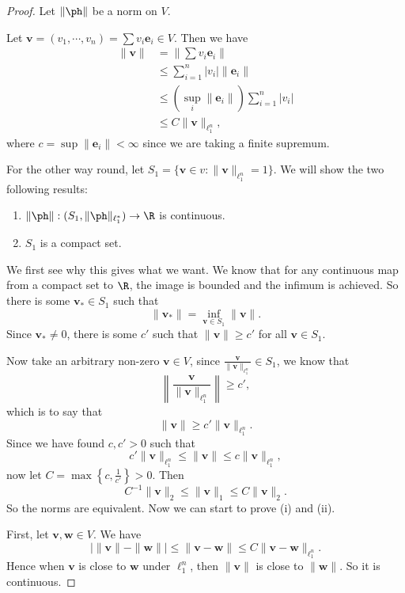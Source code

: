 \documentclass[a4paper]{article}
\begin{document}
\begin{proof}
  Let $\|\ph \|$ be a norm on $V$.

  Let $\mathbf{v} = (v_1, \cdots, v_n) = \sum v_i \mathbf{e}_i \in V$. Then we have
  \begin{align*}
    \|\mathbf{v}\| &= \left\|\sum v_i \mathbf{e}_i\right\|\\
    &\leq \sum_{i = 1}^n |v_i|\|\mathbf{e}_i\|\\
    &\leq \left(\sup_i \|\mathbf{e}_i\|\right) \sum_{i = 1}^n |v_i|\\
    &\leq C\|\mathbf{v}\|_{\ell_1^n},
  \end{align*}
  where $c = \sup \|\mathbf{e}_i\| < \infty$ since we are taking a finite supremum.

  For the other way round, let $S_1 = \{\mathbf{v}\in v: \|\mathbf{v}\|_{\ell_1^n} = 1\}$. We will show the two following results:
  \begin{enumerate}
    \item $\|\ph \|: (S_1, \|\ph \|_{\ell_1^*}) \to \R$ is continuous.
    \item $S_1$ is a compact set.
  \end{enumerate}
  We first see why this gives what we want. We know that for any continuous map from a compact set to $\R$, the image is bounded and the infimum is achieved. So there is some $\mathbf{v}_* \in S_1$ such that
  \[
    \|\mathbf{v}_*\| = \inf_{\mathbf{v}\in S_1} \|\mathbf{v}\|.
  \]
  Since $\mathbf{v}_*\not= 0$, there is some $c'$ such that $\|\mathbf{v}\| \geq c'$ for all $\mathbf{v} \in S_1$.

  Now take an arbitrary non-zero $\mathbf{v} \in V$, since $\frac{\mathbf{v}}{\|\mathbf{v}\|_{\ell_1^n}} \in S_1$, we know that
  \[
    \left\|\frac{\mathbf{v}}{\|\mathbf{v}\|_{\ell_1^n}}\right\| \geq c',
  \]
  which is to say that
  \[
    \|\mathbf{v}\| \geq c' \|\mathbf{v}\|_{\ell_1^n}.
  \]
  Since we have found $c, c' > 0$ such that
  \[
    c' \|\mathbf{v}\|_{\ell_1^n} \leq \|\mathbf{v}\|\leq c \| \mathbf{v}\|_{\ell_1^n},
  \]
  now let $C = \max\left\{c, \frac{1}{c'}\right\} > 0$. Then
  \[
    C^{-1}\|\mathbf{v}\|_2 \leq \|\mathbf{v}\|_1 \leq C\|\mathbf{v}\|_2.
  \]
  So the norms are equivalent. Now we can start to prove (i) and (ii).

  First, let $\mathbf{v}, \mathbf{w}\in V$. We have
  \[
    \big|\|\mathbf{v}\| - \|\mathbf{w}\|\big| \leq \|\mathbf{v} - \mathbf{w}\| \leq C\|\mathbf{v} - \mathbf{w}\|_{\ell_1^n}.
  \]
  Hence when $\mathbf{v}$ is close to $\mathbf{w}$ under $\ell_1^n$, then $\|\mathbf{v}\|$ is close to $\|\mathbf{w}\|$. So it is continuous.


\end{proof}
\end{document}
